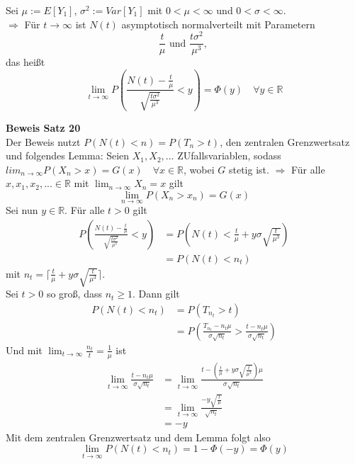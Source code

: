 \documentclass[a4paper,12pt]{article}
\begin{document}
\begin{tcolorbox}[breakable, colframe=green, colback=white, title=Satz 20]
	Sei $\mu := E[Y_1]$, $\sigma^2 := Var[Y_1]$ mit $0 < \mu < \infty$ und $0 < \sigma < \infty$.\\
	$\Rightarrow$ Für $t \to \infty$ ist $N(t)$ asymptotisch normalverteilt mit Parametern
	$$
		\frac{t}{\mu} \text{ und } \frac{t \sigma^2}{\mu^3} \text{, }
	$$
	das heißt
	$$
		\lim_{t \to \infty} P  \left(
		\frac{N(t) - \frac{t}{\mu}}{\sqrt{\frac{t\sigma^2}{\mu^3}}} <y
		\right) = \Phi(y) \quad \forall y \in \mathbb{R}
	$$
\end{tcolorbox}
\textbf{Beweis Satz 20}\\
Der Beweis nutzt $P(N(t)< n) = P(T_n > t)$, den zentralen Grenzwertsatz und folgendes Lemma:
Seien $X_1, X_2, ...$ ZUfallsvariablen, sodass $lim_{n \to \infty}P(X_n > x) = G(x) \quad \forall x \in \mathbb{R}$,
wobei $G$ stetig ist.
$\Rightarrow$ Für alle $x,x_1,x_2, ... \in \mathbb{R}$ mit $\lim_{n \to \infty}X_n = x$ gilt
$$
	\lim_{n \to \infty} P(X_n > x_n) = G(x)
$$
Sei nun $y \in \mathbb{R}$. Für alle $t>0$ gilt
\begin{align*}
	P  \left(
	\frac{N(t) - \frac{t}{\mu}}{\sqrt{\frac{t\sigma^2}{\mu^3}}} <y
	\right) & =
	P \left(N(t) < \frac{t}{\mu} + y \sigma \sqrt{\frac{t}{\mu^3}}  \right) \\
	        & = P(N(t)<n_t)
\end{align*}
mit $n_t = \lceil \frac{t}{\mu} + y \sigma \sqrt{\frac{t}{\mu^3}} \rceil $.\\
Sei $t>0$ so groß, dass $n_t \geq 1$. Dann gilt
\begin{align*}
	P(N(t)<n_t) & = P(T_{n_t}>t) \\
	            & = P  \left(
	\frac{T_{n_t} - n_t \mu}{\sigma \sqrt{n_t}} >
	\frac{t - n_t \mu}{\sigma \sqrt{n_t}}
	\right)
\end{align*}
Und mit $\lim_{t \to \infty} \frac{n_t}{t} = \frac{1}{\mu}$ ist
\begin{align*}
	\lim_{t \to \infty}
	\frac{t - n_t \mu}{\sigma \sqrt{n_t}} & =
	\lim_{t \to \infty} \frac{t- (\frac{t}{\mu} + y \sigma \sqrt{\frac{t}{\mu^3}})\mu}{\sigma \sqrt{n_t}}    \\
	                                      & = \lim_{t \to \infty} \frac{-y \sqrt{\frac{t}{\mu}}}{\sqrt{n_t}} \\
	                                      & = -y
\end{align*}
Mit dem zentralen Grenzwertsatz und dem Lemma folgt also
$$
	\lim_{t \to \infty} P(N(t) < n_t) = 1- \Phi(-y) = \Phi(y)
$$
\end{document}
